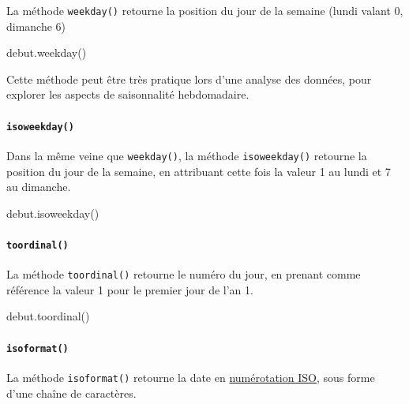\documentclass[12pt,]{book}
\newenvironment{Shaded}{\begin{snugshade}}{\end{snugshade}}
\newcommand{\NormalTok}[1]{#1}
\let\oldparagraph\paragraph
\renewcommand{\paragraph}[1]{\oldparagraph{#1}\mbox{}}
\numberwithin{equation}{section}
\numberwithin{countremarque}{section}
\let\BeginKnitrBlock\begin \let\EndKnitrBlock\end
\begin{document}
La méthode \texttt{weekday()} retourne la position du jour de la semaine
(lundi valant 0, dimanche 6)

\begin{Shaded}
\begin{Highlighting}[]
\NormalTok{debut.weekday()}
\end{Highlighting}
\end{Shaded}

\BeginKnitrBlock{remarque}
Cette méthode peut être très pratique lors d'une analyse des données,
pour explorer les aspects de saisonnalité hebdomadaire.
\EndKnitrBlock{remarque}

\paragraph{\texorpdfstring{\texttt{isoweekday()}}{isoweekday()}}\label{isoweekday}

Dans la même veine que \texttt{weekday()}, la méthode
\texttt{isoweekday()} retourne la position du jour de la semaine, en
attribuant cette fois la valeur 1 au lundi et 7 au dimanche.

\begin{Shaded}
\begin{Highlighting}[]
\NormalTok{debut.isoweekday()}
\end{Highlighting}
\end{Shaded}

\paragraph{\texorpdfstring{\texttt{toordinal()}}{toordinal()}}\label{toordinal}

La méthode \texttt{toordinal()} retourne le numéro du jour, en prenant
comme référence la valeur 1 pour le premier jour de l'an 1.

\begin{Shaded}
\begin{Highlighting}[]
\NormalTok{debut.toordinal()}
\end{Highlighting}
\end{Shaded}

\paragraph{\texorpdfstring{\texttt{isoformat()}}{isoformat()}}\label{isoformat}

La méthode \texttt{isoformat()} retourne la date en
\href{https://fr.wikipedia.org/wiki/Num\%C3\%A9rotation_ISO_des_semaines}{numérotation
ISO}, sous forme d'une chaîne de caractères.
\end{document}

